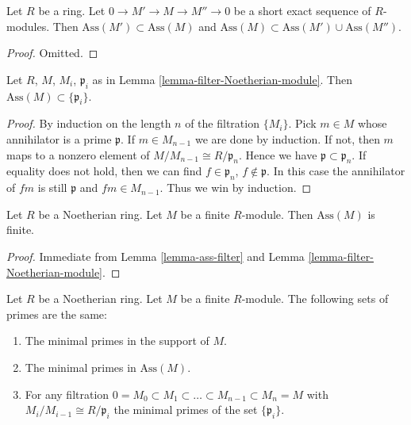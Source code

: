\begin{lemma}
\label{lemma-ass}
Let $R$ be a ring.
Let $0 \to M' \to M \to M'' \to 0$ be a short exact sequence
of $R$-modules.
Then $\text{Ass}(M') \subset \text{Ass}(M)$ and
$\text{Ass}(M) \subset \text{Ass}(M') \cup \text{Ass}(M'')$.
\end{lemma}

\begin{proof}
Omitted.
\end{proof}

\begin{lemma}
\label{lemma-ass-filter}
Let $R$, $M$, $M_i$, $\mathfrak p_i$ as in
Lemma \ref{lemma-filter-Noetherian-module}.
Then $\text{Ass}(M) \subset \{\mathfrak p_i\}$.
\end{lemma}

\begin{proof}
By induction on the length $n$ of the filtration $\{ M_i \}$.
Pick $m \in M$ whose annihilator is a prime $\mathfrak p$.
If $m \in M_{n-1}$ we are done by induction. If not,
then $m$ maps to a nonzero element of $M/M_{n-1} \cong
R/\mathfrak p_n$. Hence we have $\mathfrak p \subset \mathfrak p_n$.
If equality does not hold, then we can find $f \in \mathfrak p_n$,
$f \not\in \mathfrak p$. In this case the annihilator of $fm$ is still
$\mathfrak p$ and $fm \in M_{n-1}$. Thus we win by induction.
\end{proof}

\begin{lemma}
\label{lemma-finite-ass}
Let $R$ be a Noetherian ring.
Let $M$ be a finite $R$-module.
Then $\text{Ass}(M)$ is finite.
\end{lemma}

\begin{proof}
Immediate from Lemma \ref{lemma-ass-filter} and
Lemma \ref{lemma-filter-Noetherian-module}.
\end{proof}

\begin{proposition}
\label{proposition-minimal-primes-associated-primes}
Let $R$ be a Noetherian ring.
Let $M$ be a finite $R$-module.
The following sets of primes are the same:
\begin{enumerate}
\item The minimal primes in the support of $M$.
\item The minimal primes in $\text{Ass}(M)$.
\item For any filtration $0 = M_0 \subset M_1 \subset \ldots
\subset M_{n-1} \subset M_n = M$ with $M_i/M_{i-1} \cong R/\mathfrak p_i$
the minimal primes of the set $\{\mathfrak p_i\}$.
\end{enumerate}
\end{proposition}

